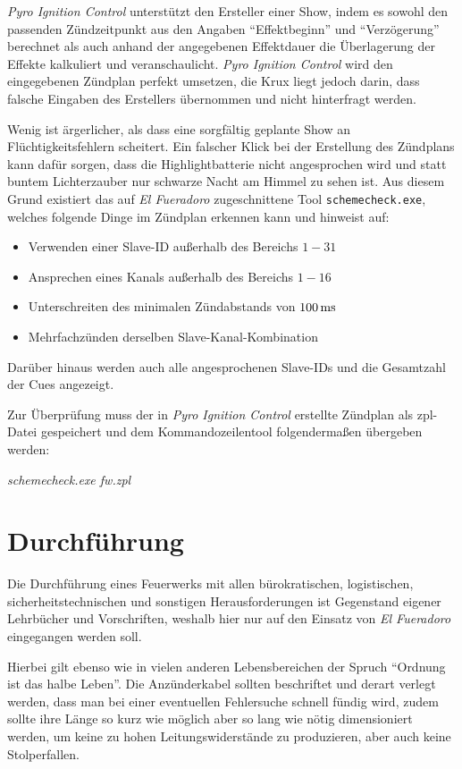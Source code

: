 \documentclass[pdftex, parskip, numbers=noenddot, toc=listof]{scrbook}
\newcommand{\pic}{\emph{Pyro Ignition Control}}
\newcommand{\anlage}{\emph{El Fueradoro}}
\begin{document}
				{\pic} unterstützt den Ersteller einer Show, indem es sowohl den passenden Zündzeitpunkt aus den Angaben \enquote{Effektbeginn} und \enquote{Verzögerung} berechnet als auch anhand der angegebenen Effektdauer die Überlagerung der Effekte kalkuliert und veranschaulicht.
				\pic{} wird den eingegebenen Zündplan perfekt umsetzen, die Krux liegt jedoch darin, dass falsche Eingaben des Erstellers übernommen und nicht hinterfragt werden.

				Wenig ist ärgerlicher, als dass eine sorgfältig geplante Show an Flüchtigkeitsfehlern scheitert. Ein falscher Klick bei der Erstellung des Zündplans kann dafür sorgen, dass die Highlightbatterie nicht angesprochen wird und statt buntem Lichterzauber nur schwarze Nacht am Himmel zu sehen ist. Aus diesem Grund existiert das auf {\anlage} zugeschnittene Tool \texttt{schemecheck.exe}, welches folgende Dinge im Zündplan erkennen kann und hinweist auf:
				\begin{itemize}
					\item Verwenden einer Slave-ID außerhalb des Bereichs $1-31$
					\item Ansprechen eines Kanals außerhalb des Bereichs $1-16$
					\item Unterschreiten des minimalen Zündabstands von $\unit[100]{ms}$
					\item Mehrfachzünden derselben Slave-Kanal-Kombination
				\end{itemize}
				Darüber hinaus werden auch alle angesprochenen Slave-IDs und die Gesamtzahl der Cues angezeigt.

				Zur Überprüfung muss der in {\pic} erstellte Zündplan als zpl-Datei gespeichert und dem Kommandozeilentool folgendermaßen übergeben werden:
				\begin{center}
					\emph{schemecheck.exe fw.zpl}
				\end{center}

		\section{Durchführung}

			Die Durchführung eines Feuerwerks mit allen bürokratischen, logistischen, sicherheitstechnischen und sonstigen Herausforderungen ist Gegenstand eigener Lehrbücher und Vorschriften, weshalb hier nur auf den Einsatz von {\anlage} eingegangen werden soll.

			Hierbei gilt ebenso wie in vielen anderen Lebensbereichen der Spruch \enquote{Ordnung ist das halbe Leben}. Die Anzünderkabel sollten beschriftet und derart verlegt werden, dass man bei einer eventuellen Fehlersuche schnell fündig wird, zudem sollte ihre Länge so kurz wie möglich aber so lang wie nötig dimensioniert werden, um keine zu hohen Leitungswiderstände zu produzieren, aber auch keine Stolperfallen.
\end{document}
